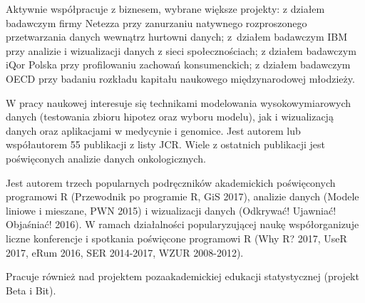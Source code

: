 \documentclass[\main/boa.tex]{subfiles}
\begin{document}
Aktywnie współpracuje z biznesem, wybrane większe projekty: z działem badawczym firmy Netezza przy zanurzaniu natywnego rozproszonego przetwarzania danych wewnątrz hurtowni danych; z~działem badawczym IBM przy analizie i wizualizacji danych z sieci społecznościach; z działem badawczym iQor Polska przy profilowaniu zachowań konsumenckich; z działem badawczym OECD przy badaniu rozkładu kapitału naukowego międzynarodowej młodzieży.

W pracy naukowej interesuje się technikami modelowania wysokowymiarowych danych (testowania zbioru hipotez oraz wyboru modelu), jak i wizualizacją danych oraz aplikacjami w medycynie i genomice. Jest autorem lub współautorem 55 publikacji z listy JCR. Wiele z ostatnich publikacji jest poświęconych analizie danych onkologicznych.

Jest autorem trzech popularnych podręczników akademickich poświęconych programowi R (Przewodnik po programie R, GiS 2017), analizie danych (Modele liniowe i mieszane, PWN 2015) i wizualizacji danych (Odkrywać! Ujawniać! Objaśniać! 2016). W ramach działalności popularyzującej naukę współorganizuje liczne konferencje i spotkania poświęcone programowi R (Why R? 2017, UseR 2017, eRum 2016, SER 2014-2017, WZUR 2008-2012). 

Pracuje również nad projektem pozaakademickiej edukacji statystycznej (projekt Beta i Bit).
\end{document}
